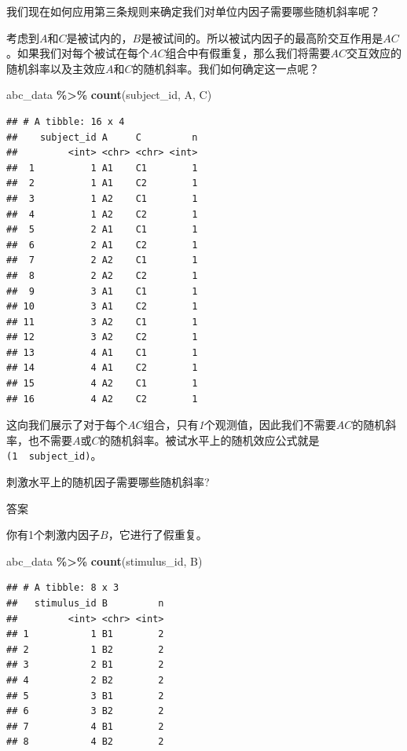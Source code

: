 \documentclass[
]{book}
\newenvironment{Shaded}{\begin{snugshade}}{\end{snugshade}}
\newcommand{\FunctionTok}[1]{\textcolor[rgb]{0.13,0.29,0.53}{\textbf{#1}}}
\newcommand{\NormalTok}[1]{#1}
\newcommand{\SpecialCharTok}[1]{\textcolor[rgb]{0.81,0.36,0.00}{\textbf{#1}}}
\begin{document}
我们现在如何应用第三条规则来确定我们对单位内因子需要哪些随机斜率呢？

考虑到\(A\)和\(C\)是被试内的，\(B\)是被试间的。所以被试内因子的最高阶交互作用是\(AC\)。如果我们对每个被试在每个\(AC\)组合中有假重复，那么我们将需要\(AC\)交互效应的随机斜率以及主效应\(A\)和\(C\)的随机斜率。我们如何确定这一点呢？

\begin{Shaded}
\begin{Highlighting}[]
\NormalTok{abc\_data }\SpecialCharTok{\%\textgreater{}\%}
  \FunctionTok{count}\NormalTok{(subject\_id, A, C)}
\end{Highlighting}
\end{Shaded}

\begin{verbatim}
## # A tibble: 16 x 4
##    subject_id A     C         n
##         <int> <chr> <chr> <int>
##  1          1 A1    C1        1
##  2          1 A1    C2        1
##  3          1 A2    C1        1
##  4          1 A2    C2        1
##  5          2 A1    C1        1
##  6          2 A1    C2        1
##  7          2 A2    C1        1
##  8          2 A2    C2        1
##  9          3 A1    C1        1
## 10          3 A1    C2        1
## 11          3 A2    C1        1
## 12          3 A2    C2        1
## 13          4 A1    C1        1
## 14          4 A1    C2        1
## 15          4 A2    C1        1
## 16          4 A2    C2        1
\end{verbatim}

这向我们展示了对于每个\(AC\)组合，只有\emph{1}个观测值，因此我们不需要\(AC\)的随机斜率，也不需要\(A\)或\(C\)的随机斜率。被试水平上的随机效应公式就是\texttt{(1\ \textbar{}\ subject\_id)}。

刺激水平上的随机因子需要哪些随机斜率?

答案

你有1个刺激内因子\(B\)，它进行了假重复。

\begin{Shaded}
\begin{Highlighting}[]
\NormalTok{abc\_data }\SpecialCharTok{\%\textgreater{}\%}
  \FunctionTok{count}\NormalTok{(stimulus\_id, B)}
\end{Highlighting}
\end{Shaded}

\begin{verbatim}
## # A tibble: 8 x 3
##   stimulus_id B         n
##         <int> <chr> <int>
## 1           1 B1        2
## 2           1 B2        2
## 3           2 B1        2
## 4           2 B2        2
## 5           3 B1        2
## 6           3 B2        2
## 7           4 B1        2
## 8           4 B2        2
\end{verbatim}
\end{document}

